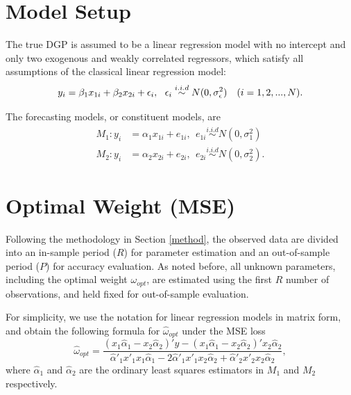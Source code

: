 \documentclass{monashthesis}
\begin{document}
\hypertarget{model-setup}{%
\section{Model Setup}\label{model-setup}}

The true DGP is assumed to be a linear regression model with no intercept and only two exogenous and weakly correlated regressors, which satisfy all assumptions of the classical linear regression model:
\begin{equation}
\label{eqn:DGP}
y_i = \beta_1 x_{1i} + \beta_2 x_{2i} + \epsilon_i, \ \ \epsilon_i \stackrel{i.i.d}{\sim} N(0,\sigma^2_{\epsilon}) \ \ \ (i = 1,2,...,N). \\
\end{equation}

The forecasting models, or constituent models, are
\begin{align*}
M_1: y_i &= \alpha_1 x_{1i} + e_{1i}, \ \ e_{1i} \stackrel{i.i.d}{\sim} N(0,\sigma^2_1) \\
M_2: y_i &= \alpha_2 x_{2i} + e_{2i}, \ \ e_{2i} \stackrel{i.i.d}{\sim} N(0,\sigma^2_2).
\end{align*}

\hypertarget{op}{%
\section{Optimal Weight (MSE)}\label{op}}

Following the methodology in Section \ref{method}, the observed data are divided into an in-sample period (\(R\)) for parameter estimation and an out-of-sample period (\(P\)) for accuracy evaluation. As noted before, all unknown parameters, including the optimal weight \(\omega_{opt}\), are estimated using the first \(R\) number of observations, and held fixed for out-of-sample evaluation.

For simplicity, we use the notation for linear regression models in matrix form, and obtain the following formula for \(\hat\omega_{opt}\) under the MSE loss
\begin{equation*}
\hat\omega_{opt} = \frac{(x_1 \hat\alpha_1 - x_2 \hat\alpha_2)' y - (x_1 \hat\alpha_1 - x_2 \hat\alpha_2)' x_2 \hat\alpha_2}{\hat\alpha'_1 x'_1 x_1 \hat\alpha_1 - 2\hat\alpha'_1 x'_1 x_2 \hat\alpha_2 + \hat\alpha'_2 x'_2 x_2 \hat\alpha_2},
\end{equation*}
where \(\hat\alpha_1\) and \(\hat\alpha_2\) are the ordinary least squares estimators in \(M_1\) and \(M_2\) respectively.
\end{document}
